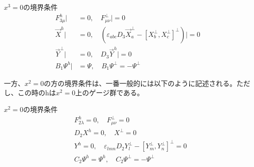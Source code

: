 \documentclass[dvipdfmx,a4paper,10.5pt]{article}
\numberwithin{equation}{section}
\begin{document}
\begin{resultbox}{$x^{3}=0$の境界条件}
        \begin{equation}
\begin{split}
     F_{3\mu}^{h}|&=0,\quad
    F_{\mu\nu}^{\perp}|=0\\
    \vec{X}^{h}|&=0,\quad
    (\varepsilon_{abc}D_{3}\vec{X}_{a}^{\perp}-[X_{b}^{\perp},X_{c}^{\perp}]^{\perp})|=0\\
    \vec{Y}^{\perp}|&=0,\quad
    D_{3}\vec{Y}^{h}|=0\\
    B_{1}\Psi^{h}|&=\Psi,\quad B_{1}\Psi^{\perp}=-\Psi^{\perp}
\end{split}
\end{equation}
\end{resultbox}
一方、$x^{2}=0$の方の境界条件は、一番一般的には以下のように記述される。ただし、この時のhは$x^{2}=0$上のゲージ群である。
\begin{resultbox}{$x^{2}=0$の境界条件}
\begin{align*}
&F^{h}_{2\lambda}=0,\quad F^{\perp}_{\mu\nu}=0\\
&D_{2}X^{h}=0,\quad X^{\perp}=0\\
&Y^{h}=0,\quad \varepsilon_{lmn}D_{2}Y_{l}^{\perp}-[Y_{m}^{\perp},Y_{n}^{\perp}]^{\perp}=0\\
&C_{2}\Psi^{h}=\Psi^{h},\quad C_{2}\Psi^{\perp}=-\Psi^{\perp}
\end{align*}
\end{resultbox}
\end{document}
